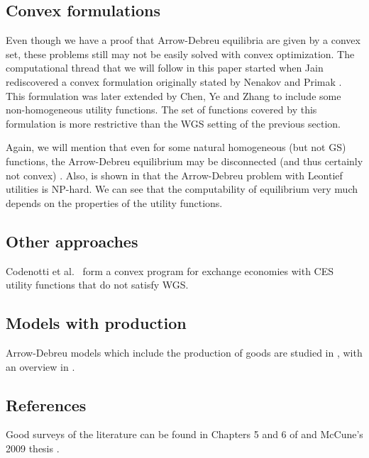 \documentclass{article}
\begin{document}
\subsection{Convex formulations}
Even though we have a proof that Arrow-Debreu equilibria are given by a convex set, these problems still may not be easily solved with convex optimization.
The computational thread that we will follow in this paper started when Jain \cite{jain2007polynomial} rediscovered a convex formulation originally stated by Nenakov and Primak \cite{nenakov1983algorithm}. This formulation was later extended by Chen, Ye and Zhang \cite{chen2007note,chen2010equilibrium} to include some non-homogeneous utility functions. The set of functions covered by this formulation is more restrictive than the WGS setting of the previous section. 

Again, we will mention that even for some natural homogeneous (but not GS) functions, the Arrow-Debreu equilibrium may be disconnected (and thus certainly not convex) \cite{gjerstad1996multiple}.
Also, is shown in \cite{codenotti2006leontief} that the Arrow-Debreu problem with Leontief utilities is NP-hard.
We can see that the computability of equilibrium very much depends on the properties of the utility functions.


\subsection{Other approaches}
Codenotti et al.\ \cite{codenotti2005market,codenotti2005marketCES} form a convex program for exchange economies with CES utility functions that do not satisfy WGS.

\subsection{Models with production}
Arrow-Debreu models which include the production of goods are studied in \cite{garg2014computability,jain2005market,codenotti2005marketExcess}, with an overview in \cite[Chapters~5--6]{nisan2007algorithmic}. 

\subsection{References}
Good surveys of the literature can be found in Chapters 5 and 6 of \cite{nisan2007algorithmic} and McCune's 2009 thesis \cite{mccune2009algorithmic}.
\end{document}
